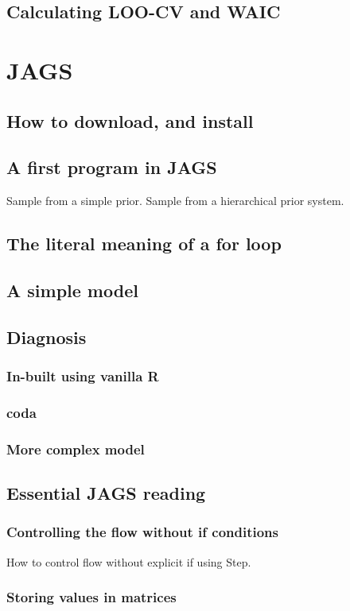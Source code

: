 \documentclass[11pt,fullpage]{book}
\begin{document}
\subsection{Calculating LOO-CV and WAIC}

\section{JAGS}
\subsection{How to download, and install}
\subsection{A first program in JAGS}
Sample from a simple prior. Sample from a hierarchical prior system.
\subsection{The literal meaning of a for loop}
\subsection{A simple model}
\subsection{Diagnosis}
\subsubsection{In-built using vanilla R}
\subsubsection{coda}
\subsubsection{More complex model}

\subsection{Essential JAGS reading}
\subsubsection{Controlling the flow without if conditions}
How to control flow without explicit if using Step.
\subsubsection{Storing values in matrices}
\end{document}

